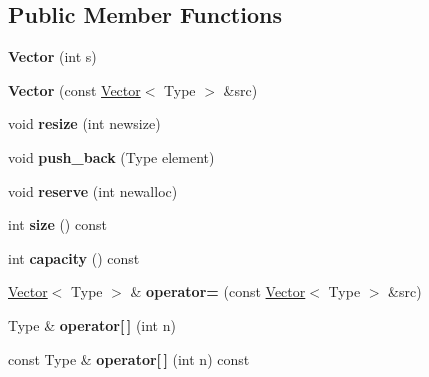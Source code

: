 \subsection*{Public Member Functions}
\begin{DoxyCompactItemize}
\item 
\mbox{\label{class_vector_a8ca8eb892b0cd3f738434dff339d5d5d}} 
{\bfseries Vector} (int s)
\item 
\mbox{\label{class_vector_a59fa44181957a5149face8088a516932}} 
{\bfseries Vector} (const \hyperlink{class_vector}{Vector}$<$ Type $>$ \&src)
\item 
\mbox{\label{class_vector_a24626edee91fdf5f8ea79c20a127c77d}} 
void {\bfseries resize} (int newsize)
\item 
\mbox{\label{class_vector_a4e0731a1b33a932943f57869acc622fd}} 
void {\bfseries push\+\_\+back} (Type element)
\item 
\mbox{\label{class_vector_abb56dece0fc435cfeb4da8a469606e59}} 
void {\bfseries reserve} (int newalloc)
\item 
\mbox{\label{class_vector_aa2cd243dd27f6e21b4d240929fb96878}} 
int {\bfseries size} () const
\item 
\mbox{\label{class_vector_ae0c31c5131b18b6e5a1e24c31fc38fca}} 
int {\bfseries capacity} () const
\item 
\mbox{\label{class_vector_a7e9dcb119d679a109ef0fe34d884451c}} 
\hyperlink{class_vector}{Vector}$<$ Type $>$ \& {\bfseries operator=} (const \hyperlink{class_vector}{Vector}$<$ Type $>$ \&src)
\item 
\mbox{\label{class_vector_a1858c8faef5af17ad87eacede83ef0d8}} 
Type \& {\bfseries operator\mbox{[}$\,$\mbox{]}} (int n)
\item 
\mbox{\label{class_vector_afcf679a0343376f9cc44e31b9d51338c}} 
const Type \& {\bfseries operator\mbox{[}$\,$\mbox{]}} (int n) const
\item 
\mbox{\label{class_vector_a679da56b02db310bbe560567749a38af}} 

\end{DoxyCompactItemize}
